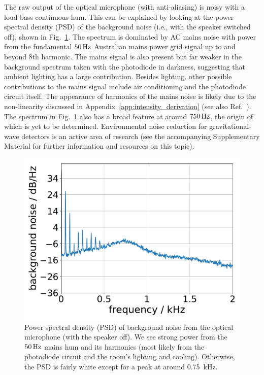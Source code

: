 \documentclass[paper-main.tex]{subfiles}
\begin{document}
The raw output of the optical microphone (with anti-aliasing) is noisy with a loud bass continuous hum. 
This can be explained by looking at the power spectral density (PSD) of the background noise (i.e., with the speaker switched off), shown in Fig.~\ref{fig:psd_noise}. 
The spectrum is dominated by AC mains noise with power from the fundamental $50\,{\rm Hz}$ Australian mains power grid signal up to and beyond $8$th harmonic. 
The mains signal is also present but far weaker in the background spectrum taken with the photodiode in darkness, suggesting that ambient lighting has a large contribution. 
Besides lighting, other possible contributions to the mains signal include air conditioning and the photodiode circuit itself. 
The appearance of harmonics of the mains noise is likely due to the non-linearity discussed in Appendix~\ref{app:intensity_derivation} (see also Ref.~\cite{feynman}). 
The spectrum in Fig.~\ref{fig:psd_noise} also has a broad feature at around $750\,{\rm Hz}$, the origin of which is yet to be determined.
Environmental noise reduction for gravitational-wave detectors is an active area of research (see the accompanying Supplementary Material for further information and resources on this topic).




\begin{figure}
	\includegraphics[width=.5\textwidth]{figures/psd_podo_14_6.pdf}
	\caption{\label{fig:psd_noise}
Power spectral density (PSD) of background noise from the optical microphone (with the speaker off). 
We see strong power from the $50\,{\rm Hz}$ mains hum and its harmonics (most likely from the photodiode circuit and the room’s lighting and cooling). Otherwise, the PSD is fairly white except for a peak at around 0.75~kHz. 
}
\end{figure}
\end{document}
